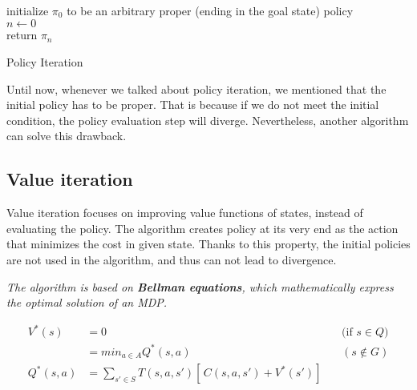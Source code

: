 \LinesNumbered
\begin{algorithm}[H]
\SetAlgoLined
initialize $\pi_0$ to be an arbitrary proper (ending in the goal state) policy \\
$n \xleftarrow{} 0$ \\
return $\pi_n$
\caption{Policy Iteration}
\end{algorithm}

Until now, whenever we talked about policy iteration, we mentioned that the initial policy has to be proper.
That is because if we do not meet the initial condition, the policy evaluation step will diverge.
Nevertheless, another algorithm can solve this drawback.


\subsection{Value iteration}
Value iteration focuses on improving value functions of states, instead of evaluating the policy. The algorithm creates policy at its very end as the action that minimizes the cost in given state. Thanks to this property, the initial policies are not used in the algorithm, and thus can not lead to divergence.

\textit{The algorithm is based on \textbf{Bellman equations}, which mathematically express the optimal solution of an MDP.}

\begin{equation}
\begin{aligned}
V^* (s) & = 0 && \text{(if $s \in Q$)} \\
& = min_{a \in A} Q^* (s, a) &&  (s \notin G) \\ 
Q^* (s, a) & = \sum_{s' \in S} T(s, a, s')[ \,C(s, a, s') + V^*(s')] \, \\
\end{aligned}
\end{equation}

